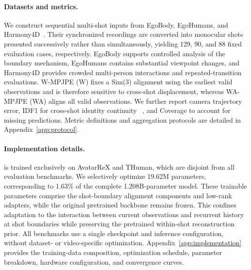\paragraph{Datasets and metrics.}
We construct sequential multi-shot inputs from EgoBody, EgoHumans, and
Harmony4D~\citep{zhang2022egobody,khirodkar2023egohumans,khirodkar2024harmony4d}.
Their synchronized recordings are converted into monocular shots presented
successively rather than simultaneously, yielding 129, 90, and 88 fixed
evaluation cases, respectively. EgoBody supports controlled analysis of the
boundary mechanism, EgoHumans contains substantial viewpoint changes, and
Harmony4D provides crowded multi-person interactions and repeated-transition
evaluations. W-MPJPE (W) fixes a Sim(3) alignment using the earliest valid
observations and is therefore sensitive to cross-shot displacement, whereas
WA-MPJPE (WA) aligns all valid observations. We further report camera
trajectory error, IDF1 for cross-shot identity continuity
~\citep{ristani2016performance}, and Coverage to account for missing
predictions. Metric definitions and aggregation protocols are detailed in
Appendix~\ref{app:protocol}.

\paragraph{Implementation details.}
\method{} is trained exclusively on AvatarReX and THuman, which are disjoint
from all evaluation benchmarks. We selectively optimize 19.62M parameters,
corresponding to 1.63\% of the complete 1.208B-parameter model. These
trainable parameters comprise the shot-boundary alignment components and
low-rank adapters, while the original pretrained backbone remains frozen.
This confines adaptation to the interaction between current observations and
recurrent history at shot boundaries while preserving the pretrained
within-shot reconstruction prior. All benchmarks use a single checkpoint and
inference configuration, without dataset- or video-specific optimization.
Appendix~\ref{app:implementation} provides the training-data composition,
optimization schedule, parameter breakdown, hardware configuration, and
convergence curves.

